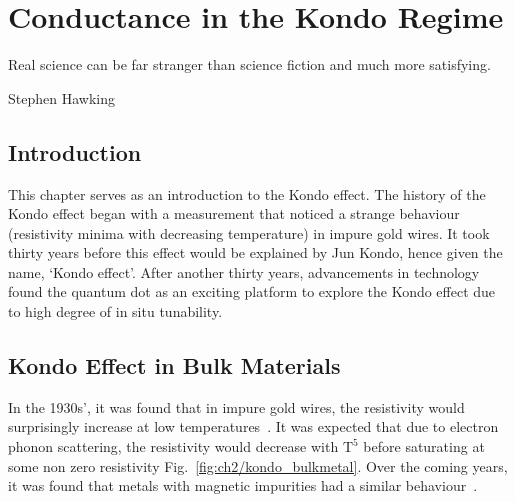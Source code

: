 \chapter{Conductance in the Kondo Regime}\label{cha:kondo_conductance}


\epigraph{Real science can be far stranger than science fiction and much more satisfying.}{Stephen Hawking}


\section{Introduction}
This chapter serves as an introduction to the Kondo effect. The history of the Kondo effect began with a measurement that noticed a strange behaviour (resistivity minima with decreasing temperature) in impure gold wires. It took thirty years before this effect would be explained by Jun Kondo, hence given the name, `Kondo effect'. After another thirty years, advancements in technology found the quantum dot as an exciting platform to explore the Kondo effect due to high degree of in situ tunability. 


\afterpage{\clearpage}
\section{Kondo Effect in Bulk Materials}


In the 1930s', it was found that in impure gold wires, the resistivity would surprisingly increase at low temperatures~\cite{de_haas}. It was expected that due to electron phonon scattering, the resistivity would decrease with $\mathrm{T^5}$ before saturating at some non zero resistivity Fig.~\ref{fig:ch2/kondo_bulkmetal}. Over the coming years, it was found that metals with magnetic impurities had a similar behaviour~\cite{still_irresistible}.



